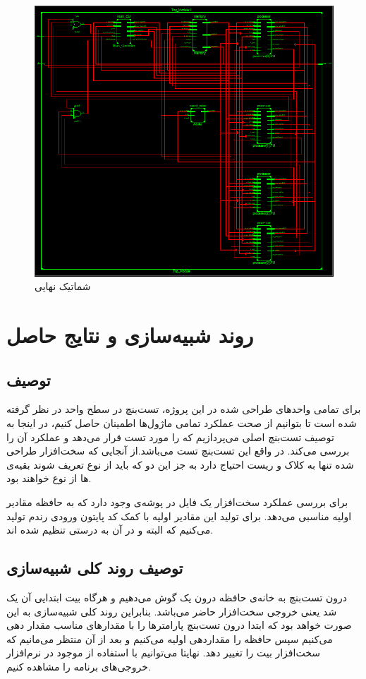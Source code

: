 \documentclass[12pt,onecolumn,a4paper,fleqn]{article}
\begin{document}
	\begin{figure}[h]
	\centering
	\includegraphics[width=0.95\linewidth]{source/scheeem.png}
	\caption{شماتیک نهایی }
\end{figure}


\pagebreak


\pagebreak
\section{روند شبیه‌سازی و نتایج حاصل}
\subsection{توصیف }
برای تمامی واحد‌های طراحی شده در این پروژه، تست‌بنچ در سطح واحد در نظر گرفته شده است تا بتوانیم از صحت عملکرد تمامی ماژول‌ها اطمینان حاصل کنیم، در اینجا به توصیف تست‌‌بنچ اصلی می‌پردازیم که  را مورد تست قرار می‌دهد و عملکرد‌ آن را بررسی می‌کند.
در واقع این تست‌بنچ تست  می‌باشد.از آنجایی که سخت‌افزار طراحی شده تنها به کلاک و ریست احتیاج دارد به جز این دو که باید از نوع  تعریف شوند بقیه‌ی ها از نوع   خواهند بود.

برای بررسی عملکرد سخت‌افزار یک فایل  در پوشه‌ی  وجود دارد که به حافظه‌ مقادیر اولیه مناسبی می‌دهد. برای تولید این مقادیر اولیه با کمک کد پایتون  ورودی رندم تولید می‌کنیم که البته  و  در آن به درستی تنظیم شده اند.
\subsection{توصیف روند کلی شبیه‌سازی}
درون تست‌بنچ به خانه‌ی  حافظه درون یک  گوش می‌دهیم و هرگاه بیت ابتدایی آن یک شد یعنی خروجی سخت‌افزار حاضر می‌باشد. بنابراین روند کلی شبیه‌سازی به این صورت خواهد بود که ابتدا درون تست‌بنچ پارامتر‌ها را با مقدارهای مناسب  مقدار دهی می‌کنیم سپس حافظه را مقداردهی اولیه می‌کنیم و بعد از آن منتظر می‌مانیم که سخت‌افزار بیت  را تغییر دهد. نهایتا می‌توانیم با استفاده از  موجود در نرم‌افزار  خروجی‌های برنامه‌ را مشاهده کنیم.
\end{document}

